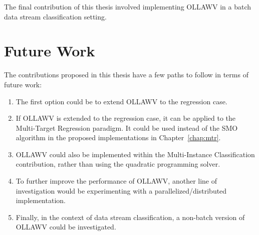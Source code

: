 \documentclass[reqno]{vcuthesis}
\numberwithin{equation}{chapter}
\begin{document}
The final contribution of this thesis involved implementing OLLAWV in a batch data stream classification setting. 

\chapter{Future Work}
The contributions proposed in this thesis have a few paths to follow in terms of future work:
\begin{enumerate}
\item The first option could be to extend OLLAWV to the regression case. 
\item If OLLAWV is extended to the regression case, it can be applied to the Multi-Target Regression paradigm. It could be used instead of the SMO algorithm in the proposed implementations in Chapter~\ref{chap:mtr}. 
\item OLLAWV could also be implemented within the Multi-Instance Classification contribution, rather than using the quadratic programming solver. 
\item To further improve the performance of OLLAWV, another line of investigation would be experimenting with a parallelized/distributed implementation.
\item Finally, in the context of data stream classification, a non-batch version of OLLAWV could be investigated.
\end{enumerate}

\printbibliography[title={References}, heading=bibintoc]
\end{document}
